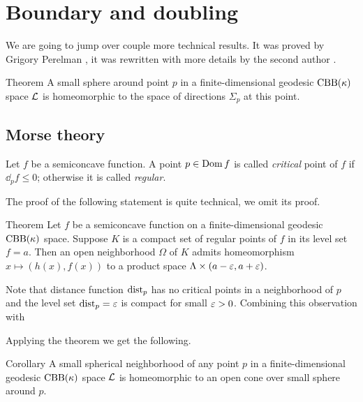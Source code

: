 \chapter{Boundary and doubling}


We are going to jump over couple more technical results.
It was proved by Grigory Perelman \cite{perelman1991}, 
it was rewritten with more details by the second author \cite{kapovitch}.

\begin{thm}{Theorem}
A small sphere around point $p$ in a finite-dimensional geodesic $\mathrm{CBB}(\kappa)$ space $\mathcal{L}$
is homeomorphic to the space of directions $\Sigma_p$ at this point.
\end{thm}

\section{Morse theory}

Let $f$ be a semiconcave function.
A point $p\in \mathop{\rm Dom}\nolimits f$ is called \emph{critical} point of $f$ if $\dd_pf\le 0$; 
otherwise it is called \emph{regular}.

The proof of the following statement is quite technical, we omit its proof.

\begin{thm}{Theorem}
Let $f$ be a semiconcave function on a finite-dimensional geodesic $\mathrm{CBB}(\kappa)$ space.
Suppose $K$ is a compact set of regular points of $f$ in its level set $f=a$.
Then an open neighborhood $\Omega$ of $K$ admits homeomorphism $x\mapsto (h(x),f(x))$ to a product space $\Lambda\times (a-\varepsilon,a+\varepsilon)$.

\end{thm}

Note that distance function $\mathrm{dist}_p$ has no critical points in a neighborhood of $p$ and the level set $\mathrm{dist}_p=\varepsilon$ is compact for small $\varepsilon>0$.
Combining this observation with 

Applying the theorem we get the following.

\begin{thm}{Corollary}
A small spherical neighborhood of any point $p$ in a finite-dimensional geodesic $\mathrm{CBB}(\kappa)$ space $\mathcal{L}$ is homeomorphic to an open cone over small sphere around $p$.
\end{thm}










